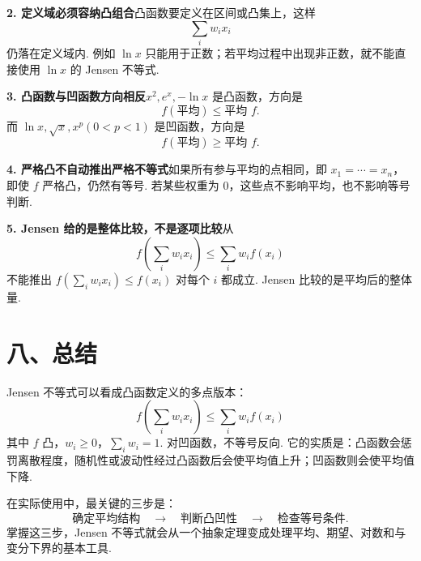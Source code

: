 \documentclass[UTF8,12pt,a4paper,fontset=fandol]{ctexart}
\begin{document}
\noindent\textbf{2. 定义域必须容纳凸组合}\quad 凸函数要定义在区间或凸集上，这样
\[
  \sum_iw_ix_i
\]
仍落在定义域内. 例如 $\ln x$ 只能用于正数；若平均过程中出现非正数，就不能直接使用 $\ln x$ 的 Jensen 不等式.

\noindent\textbf{3. 凸函数与凹函数方向相反}\quad $x^2,e^x,-\ln x$ 是凸函数，方向是
\[
  f(\text{平均})\le \text{平均 }f.
\]
而 $\ln x,\sqrt x,x^p(0<p<1)$ 是凹函数，方向是
\[
  f(\text{平均})\ge \text{平均 }f.
\]

\noindent\textbf{4. 严格凸不自动推出严格不等式}\quad 如果所有参与平均的点相同，即 $x_1=\cdots=x_n$，即使 $f$ 严格凸，仍然有等号. 若某些权重为 $0$，这些点不影响平均，也不影响等号判断.

\noindent\textbf{5. Jensen 给的是整体比较，不是逐项比较}\quad 从
\[
  f\left(\sum_iw_ix_i\right)\le\sum_iw_if(x_i)
\]
不能推出 $f(\sum_iw_ix_i)\le f(x_i)$ 对每个 $i$ 都成立. Jensen 比较的是平均后的整体量.

\section*{八、总结}

Jensen 不等式可以看成凸函数定义的多点版本：
\[
  \boxed{
  f\left(\sum_iw_ix_i\right)\le\sum_iw_if(x_i)
  }
\]
其中 $f$ 凸，$w_i\ge0$，$\sum_iw_i=1$. 对凹函数，不等号反向. 它的实质是：凸函数会惩罚离散程度，随机性或波动性经过凸函数后会使平均值上升；凹函数则会使平均值下降.

在实际使用中，最关键的三步是：
\[
  \text{确定平均结构}\quad\longrightarrow\quad
  \text{判断凸凹性}\quad\longrightarrow\quad
  \text{检查等号条件}.
\]
掌握这三步，Jensen 不等式就会从一个抽象定理变成处理平均、期望、对数和与变分下界的基本工具.
\end{document}
